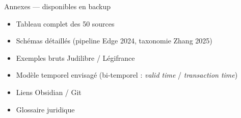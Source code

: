 \documentclass[aspectratio=169,10pt]{beamer}
\begin{document}
\appendix
\begin{frame}{Annexes --- disponibles en backup}
  \begin{itemize}
    \item Tableau complet des 50 sources
    \item Schémas détaillés (pipeline Edge 2024, taxonomie Zhang 2025)
    \item Exemples bruts Judilibre / Légifrance
    \item Modèle temporel envisagé (bi-temporel : \textit{valid time} / \textit{transaction time})
    \item Liens Obsidian / Git
    \item Glossaire juridique
  \end{itemize}
\end{frame}
\end{document}
